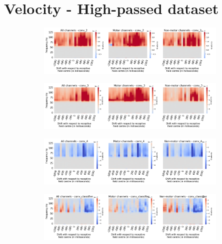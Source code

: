 \section*{Velocity - High-passed dataset}\label{subsec:vel-high-passed-dataset-appendixC}
\begin{figure}[!htpb]
\centering
\begin{subfigure}[b]{\textwidth}
   \includegraphics[width=0.85\linewidth]{img/appendix/C/hp-m/vel/sbp0_hp_m_shift_gradients_conv_2_all_kinds}
   \caption{}
   \label{fig:vel-hp-shifting-grads-conv-2}
\end{subfigure}

\begin{subfigure}[b]{\textwidth}
   \includegraphics[width=0.85\linewidth]{img/appendix/C/hp-m/vel/sbp0_hp_m_shift_gradients_conv_3_all_kinds}
   \caption{}
   \label{fig:vel-hp-shifting-grads-conv-3}
\end{subfigure}

\begin{subfigure}[b]{\textwidth}
   \includegraphics[width=0.85\linewidth]{img/appendix/C/hp-m/vel/sbp0_hp_m_shift_gradients_conv_4_all_kinds}
   \caption{}
   \label{fig:vel-hp-shifting-grads-conv-4}
\end{subfigure}

\begin{subfigure}[b]{\textwidth}
   \includegraphics[width=0.85\linewidth]{img/appendix/C/hp-m/vel/sbp0_hp_m_shift_gradients_conv_classifier_all_kinds}
   \caption{}
   \label{fig:vel-hp-shifting-grads-conv-classifier}
\end{subfigure}


\end{figure}
